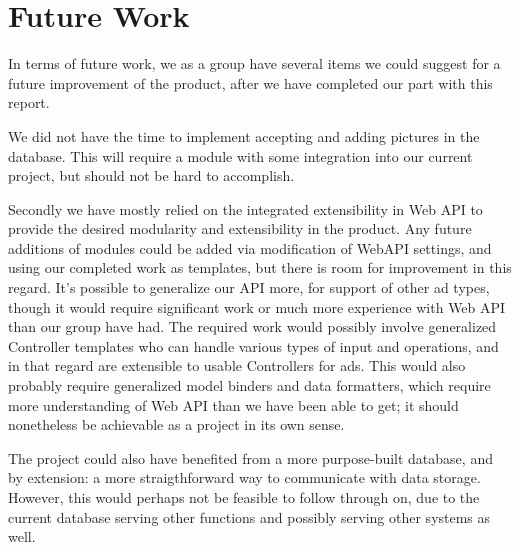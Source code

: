 \section{Future Work}

In terms of future work, we as a group have several items we could suggest for a future improvement of the product, after we have completed our part with this report.

We did not have the time to implement accepting and adding pictures in the database. This will require a module with some integration into our current project, but should not be
hard to accomplish.

Secondly we have mostly relied on the integrated extensibility in Web API to provide the desired modularity and extensibility in the product. Any future additions of modules could be
added via modification of WebAPI settings, and using our completed work as templates, but there is room for improvement in this regard. It's possible to generalize our API more, for support
of other ad types, though it would require significant work or much more experience with Web API than our group have had. The required work would possibly involve generalized Controller templates
who can handle various types of input and operations, and in that regard are extensible to usable Controllers for ads. This would also probably require generalized model binders and data formatters, which require more understanding of Web API than we have been able to get; it should nonetheless be achievable as a project in its own sense.

The project could also have benefited from a more purpose-built database, and by extension: a more straigthforward way to communicate with data storage. However, this would perhaps not be feasible to follow through on, due to the current database serving other functions and possibly serving other systems as well.
